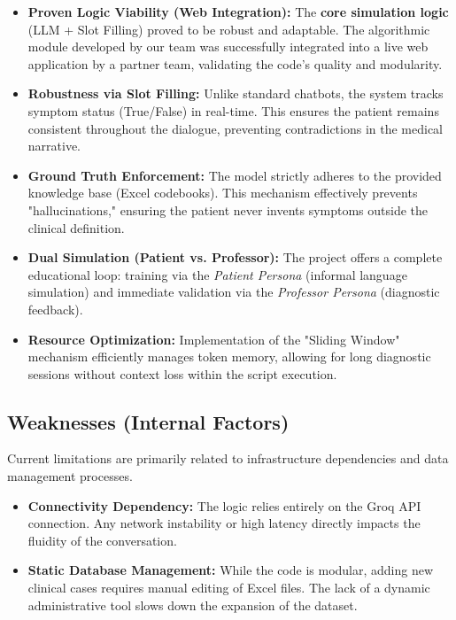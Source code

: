 \documentclass{article}
\begin{document}
\begin{itemize}[itemsep=0.5em]
    \item \textbf{Proven Logic Viability (Web Integration):} 
    The \textbf{core simulation logic} (LLM + Slot Filling) proved to be robust and adaptable. The algorithmic module developed by our team was successfully integrated into a live web application by a partner team, validating the code's quality and modularity.
    
    \item \textbf{Robustness via Slot Filling:} 
    Unlike standard chatbots, the system tracks symptom status (True/False) in real-time. This ensures the patient remains consistent throughout the dialogue, preventing contradictions in the medical narrative.
    
    \item \textbf{Ground Truth Enforcement:} 
    The model strictly adheres to the provided knowledge base (Excel codebooks). This mechanism effectively prevents "hallucinations," ensuring the patient never invents symptoms outside the clinical definition.
    
    \item \textbf{Dual Simulation (Patient vs. Professor):} 
    The project offers a complete educational loop: training via the \textit{Patient Persona} (informal language simulation) and immediate validation via the \textit{Professor Persona} (diagnostic feedback).
    
    \item \textbf{Resource Optimization:} 
    Implementation of the "Sliding Window" mechanism efficiently manages token memory, allowing for long diagnostic sessions without context loss within the script execution.
\end{itemize}

\subsection{Weaknesses (Internal Factors)}
Current limitations are primarily related to infrastructure dependencies and data management processes.

\begin{itemize}[itemsep=0.5em]
    \item \textbf{Connectivity Dependency:} 
    The logic relies entirely on the Groq API connection. Any network instability or high latency directly impacts the fluidity of the conversation.
    
    \item \textbf{Static Database Management:} 
    While the code is modular, adding new clinical cases requires manual editing of Excel files. The lack of a dynamic administrative tool slows down the expansion of the dataset.
\end{itemize}
\end{document}
